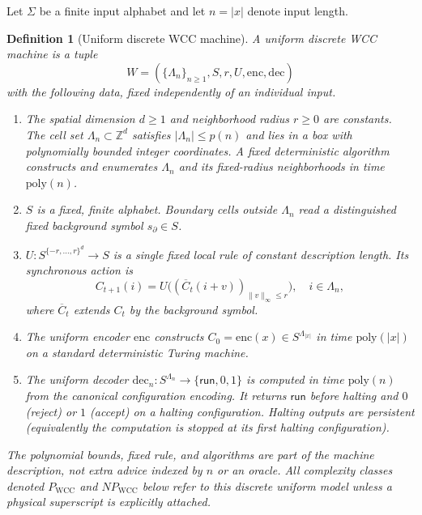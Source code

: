 \documentclass[12pt]{article}
\newtheorem{definition}[theorem]{Definition}
\begin{document}
Let $\Sigma$ be a finite input alphabet and let $n = |x|$ denote input length.

\begin{definition}[Uniform discrete WCC machine]
\label{def:wcc_machine}
A \emph{uniform discrete WCC machine} is a tuple
\[
 W=(\{\Lambda_n\}_{n\ge1},S,r,U,\mathrm{enc},\mathrm{dec})
\]
with the following data, fixed independently of an individual input.
\begin{enumerate}
\item The spatial dimension $d\ge1$ and neighborhood radius $r\ge0$
are constants. The cell set $\Lambda_n\subset\mathbb{Z}^d$ satisfies
$|\Lambda_n|\le p(n)$ and lies in a box with polynomially bounded
integer coordinates. A fixed deterministic algorithm constructs and
enumerates $\Lambda_n$ and its fixed-radius neighborhoods in time
$\mathrm{poly}(n)$.
\item $S$ is a fixed, finite alphabet. Boundary cells outside $\Lambda_n$
read a distinguished fixed background symbol $s_\partial\in S$.
\item $U:S^{\{-r,\ldots,r\}^d}\to S$ is a single fixed local rule
of constant description length. Its synchronous action is
\[
 C_{t+1}(i)=U\bigl((\overline C_t(i+v))_{\|v\|_\infty\le r}\bigr),
 \quad i\in\Lambda_n,
\]
where $\overline C_t$ extends $C_t$ by the background symbol.
\item The uniform encoder $\mathrm{enc}$ constructs
$C_0=\mathrm{enc}(x)\in S^{\Lambda_{|x|}}$ in time
$\mathrm{poly}(|x|)$ on a standard deterministic Turing machine.
\item The uniform decoder $\mathrm{dec}_n:S^{\Lambda_n}\to
\{\mathsf{run},0,1\}$ is computed in time $\mathrm{poly}(n)$
from the canonical configuration encoding. It returns $\mathsf{run}$
before halting and $0$ (reject) or $1$ (accept) on a halting
configuration. Halting outputs are persistent (equivalently the
computation is stopped at its first halting configuration).
\end{enumerate}
The polynomial bounds, fixed rule, and algorithms are part of the
machine description, not extra advice indexed by $n$ or an oracle.
All complexity classes denoted $P_{\mathrm{WCC}}$ and
$NP_{\mathrm{WCC}}$ below refer to this \emph{discrete uniform} model
unless a physical superscript is explicitly attached.
\end{definition}
\end{document}

